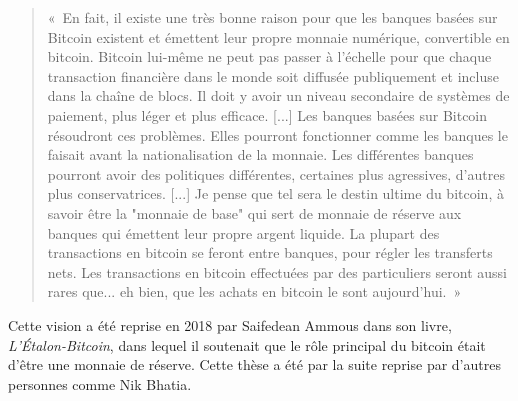 \begin{quote}
«~En fait, il existe une très bonne raison pour que les banques basées sur Bitcoin existent et émettent leur propre monnaie numérique, convertible en bitcoin. Bitcoin lui-même ne peut pas passer à l'échelle pour que chaque transaction financière dans le monde soit diffusée publiquement et incluse dans la chaîne de blocs. Il doit y avoir un niveau secondaire de systèmes de paiement, plus léger et plus efficace. [...] Les banques basées sur Bitcoin résoudront ces problèmes. Elles pourront fonctionner comme les banques le faisait avant la nationalisation de la monnaie. Les différentes banques pourront avoir des politiques différentes, certaines plus agressives, d'autres plus conservatrices. [...] Je pense que tel sera le destin ultime du bitcoin, à savoir être la "monnaie de base" qui sert de monnaie de réserve aux banques qui émettent leur propre argent liquide. La plupart des transactions en bitcoin se feront entre banques, pour régler les transferts nets. Les transactions en bitcoin effectuées par des particuliers seront aussi rares que... eh bien, que les achats en bitcoin le sont aujourd'hui.~»
\end{quote}

Cette vision a été reprise en 2018 par Saifedean Ammous dans son livre, \emph{L'Étalon-Bitcoin}, dans lequel il soutenait que le rôle principal du bitcoin était d'être une monnaie de réserve. Cette thèse a été par la suite reprise par d'autres personnes comme Nik Bhatia. %

